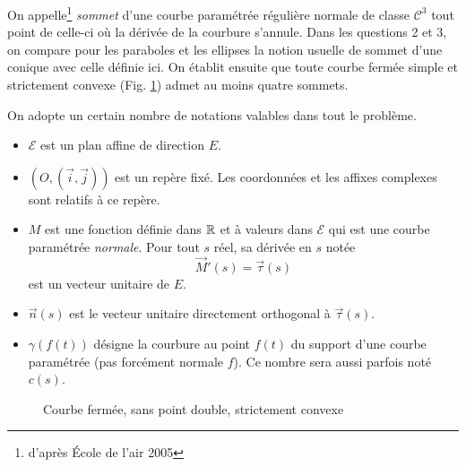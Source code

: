 On appelle\footnote{d'après \'Ecole de l'air 2005} \emph{sommet} d'une courbe paramétrée régulière normale de classe $\mathcal C^3$ tout point de celle-ci où la dérivée de la courbure s'annule.\newline
Dans les questions 2 et 3, on compare pour les paraboles et les ellipses la notion usuelle de sommet d'une conique avec celle définie ici. On établit ensuite que toute courbe fermée simple et strictement convexe (Fig. \ref{fig:Esommets_1}) admet au moins quatre sommets. 

On adopte un certain nombre de notations valables dans tout le problème.
\begin{itemize}
 \item $\mathcal E$ est un plan affine de direction $E$.
\item $(O,(\overrightarrow i,\overrightarrow j))$ est un repère fixé. Les coordonnées et les affixes complexes sont relatifs à ce repère.
\item $M$ est une fonction définie dans $\mathbb{R}$ et à valeurs dans $\mathcal E$ qui est une courbe paramétrée \emph{normale}. Pour tout $s$ réel, sa dérivée en $s$ notée
\begin{displaymath}
 \overrightarrow M '(s) = \overrightarrow \tau (s)
\end{displaymath}
est un vecteur unitaire de $E$.
\item $\overrightarrow n(s)$ est le vecteur unitaire directement orthogonal à $\overrightarrow\tau(s)$.
\item $\gamma(f(t))$ désigne la courbure au point $f(t)$ du support d'une courbe paramétrée (pas forcément normale $f$). Ce nombre sera aussi parfois noté $c(s)$.
\end{itemize}
\begin{figure}[ht!]
 \centering
 
 \caption{Courbe fermée, sans point double, strictement convexe}
 \label{fig:Esommets_1}
\end{figure}

